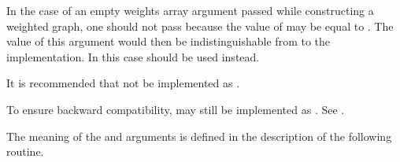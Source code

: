 \begin{users}
In the case of an empty weights array argument passed while constructing
a weighted graph, one should not pass  because the value of
 may be equal to . The value of this argument
would then be indistinguishable from  to the
implementation. In this case  should be used
instead.
\end{users}

\begin{implementors}
It is recommended that  not be implemented as
.
\end{implementors}

\begin{rationale}
To ensure backward compatibility,  may still be
implemented as . See .
\end{rationale}

The meaning of the  and  arguments is defined
in the description of the following routine.

